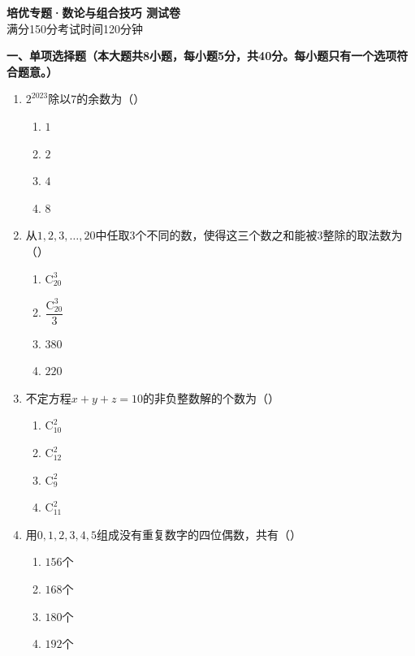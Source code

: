 \documentclass[12pt, a4paper]{ctexart}
\begin{document}
\begin{center}
{\Large\bfseries 培优专题·数论与组合技巧 测试卷}\\[0.5em]
{\normalsize 满分150分\quad 考试时间120分钟}
\end{center}

\vspace{0.5em}

\noindent\textbf{一、单项选择题（本大题共8小题，每小题5分，共40分。每小题只有一个选项符合题意。）}

\begin{enumerate}[label=\Alph*.]

\item $2^{2023}$除以$7$的余数为（\quad）
\begin{enumerate}[label=]
\item $1$ \qquad \item $2$ \qquad \item $4$ \qquad \item $8$
\end{enumerate}

\item 从$1,2,3,\ldots,20$中任取$3$个不同的数，使得这三个数之和能被$3$整除的取法数为（\quad）
\begin{enumerate}[label=]
\item $\mathrm{C}_{20}^3$ \qquad \item $\dfrac{\mathrm{C}_{20}^3}{3}$ \qquad \item $380$ \qquad \item $220$
\end{enumerate}

\item 不定方程$x+y+z=10$的非负整数解的个数为（\quad）
\begin{enumerate}[label=]
\item $\mathrm{C}_{10}^2$ \qquad \item $\mathrm{C}_{12}^2$ \qquad \item $\mathrm{C}_{9}^2$ \qquad \item $\mathrm{C}_{11}^2$
\end{enumerate}

\item 用$0,1,2,3,4,5$组成没有重复数字的四位偶数，共有（\quad）
\begin{enumerate}[label=]
\item $156$个 \qquad \item $168$个 \qquad \item $180$个 \qquad \item $192$个
\end{enumerate}


\end{enumerate}
\end{document}
